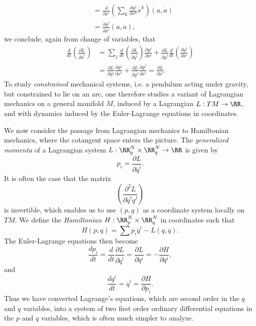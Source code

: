 \begin{example}
\begin{align*}
        &= \frac{\partial}{\partial x^i} \left( \sum_k \frac{\partial y^j}{\partial x^k} \dot{x}^k \right)(a, \dot{a})\\
        &= \frac{\partial \dot{y}^j}{\partial x^i}(a, \dot{a}),
    \end{align*}
    we conclude, again from change of variables, that
    \begin{align*}
        \frac{d}{dt} \left( \frac{\partial L}{\partial \dot{x}^i} \right) &= \sum_j \frac{d}{dt} \left( \frac{\partial L}{\partial \dot{y}^j} \right) \frac{\partial y^j}{\partial x^i} + \frac{\partial L}{\partial \dot{y}^j} \frac{d}{dt} \left( \frac{\partial y^j}{\partial x^i} \right)\\
        &= \frac{\partial L}{\partial y^j} \frac{\partial y^j}{\partial x^i} + \frac{\partial L}{\partial \dot{y}^j} \frac{\partial \dot{y}^j}{\partial x^i} = \frac{\partial L}{\partial x^i}.
    \end{align*}
    To study \emph{constrained} mechanical systems, i.e. a pendulum acting under gravity, but constrained to lie on an arc, one therefore studies a variant of Lagrangian mechanics on a general manifold $M$, induced by a Lagrangian $L: TM \to \RR$, and with dynamics induced by the Euler-Lagrange equations in coordinates.

    We now consider the passage from Lagrangian mechanics to Hamiltonian mechanics, where the cotangent space enters the picture. The \emph{generalized momenta} of a Lagrangian system $L: \RR^N_q \times \RR^N_{\dot{q}} \to \RR$ is given by
    \[ p_i = \frac{\partial L}{\partial \dot{q}^i}. \]
    It is often the case that the matrix
    \[ \left( \frac{\partial^2 L}{\partial \dot{q}^i \dot{q}^j} \right) \]
    is invertible, which enables us to use $(p,q)$ as a coordinate system locally on $TM$. We define the \emph{Hamiltonian} $H: \RR^N_p \times \RR^N_q$ in coordinates such that
    \[ H(p,q) = \sum p_i \dot{q}^i - L(q,\dot{q}). \]
    The Euler-Lagrange equations then become
    \[ \frac{dp_i}{dt} = \frac{d}{dt} \frac{\partial L}{\partial \dot{q}^i} = \frac{\partial L}{\partial q^i} = - \frac{\partial H}{\partial q^i}, \]
    and
    \[ \frac{dq^i}{dt} = \dot{q}^i = \frac{\partial H}{\partial p_i}. \]
    Thus we have converted Lagrange's equations, which are second order in the $q$ and $\dot{q}$ variables, into a system of two first order ordinary differential equations in the $p$ and $q$ variables, which is often much simpler to analyze.


\end{example}
